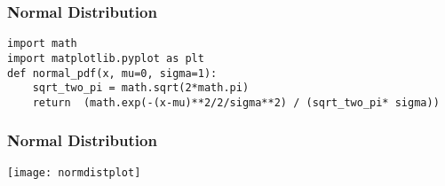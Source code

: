 \begin{frame}[fragile]\frametitle{Normal Distribution}
\begin{lstlisting}
import math
import matplotlib.pyplot as plt
def normal_pdf(x, mu=0, sigma=1):
	sqrt_two_pi = math.sqrt(2*math.pi)
	return	(math.exp(-(x-mu)**2/2/sigma**2) / (sqrt_two_pi* sigma))
\end{lstlisting}
\end{frame}

\begin{frame}[fragile]\frametitle{Normal Distribution}
\begin{center}
\texttt{[image: normdistplot]}
\end{center}
\end{frame}
